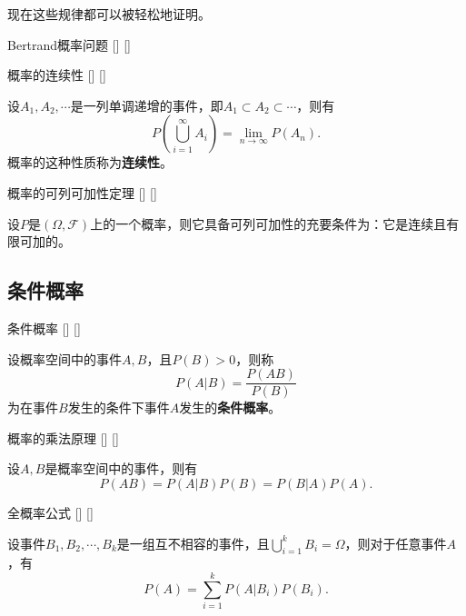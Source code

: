 \documentclass[UTF8]{ctexart}
\begin{document}
        现在这些规律都可以被轻松地证明。

        \begin{cxmp}
            []
            {Bertrand概率问题}
            []
            []
        \end{cxmp}

        \begin{dfn}
            []
            {概率的连续性}
            []
            []


            设$A_1,A_2,\cdots$是一列单调递增的事件，即$A_1\subset A_2\subset\cdots$，则有\[P\left(\bigcup_{i=1}^{\infty}A_i\right)=\lim_{n\to\infty}P(A_n).\]概率的这种性质称为\textbf{连续性}。
        \end{dfn}
        
        \begin{thm}
            []
            {概率的可列可加性定理}
            []
            []


            设$P$是$(\Omega,\mathcal{F})$上的一个概率，则它具备可列可加性的充要条件为：它是连续且有限可加的。
        \end{thm}

        \begin{prf}
            
            
            
            
            
        \end{prf}

    \subsection{条件概率}

        \begin{dfn}
            []
            {条件概率}
            []
            []


            设概率空间中的事件$A,B$，且$P(B)>0$，则称\[P(A|B)=\frac{P(AB)}{P(B)}\]为在事件$B$发生的条件下事件$A$发生的\textbf{条件概率}。
        \end{dfn}

        \begin{ppt}
            []
            {概率的乘法原理}
            []
            []


            设$A,B$是概率空间中的事件，则有\[P(AB)=P(A|B)P(B)=P(B|A)P(A).\]
        \end{ppt}

        \begin{thm}
            []
            {全概率公式}
            []
            []


            设事件$B_1,B_2,\cdots,B_k$是一组互不相容的事件，且$\bigcup_{i=1}^{k}B_i=\Omega$，则对于任意事件$A$，有\[P(A)=\sum_{i=1}^{k}P(A|B_i)P(B_i).\]
        \end{thm}
\end{document}
